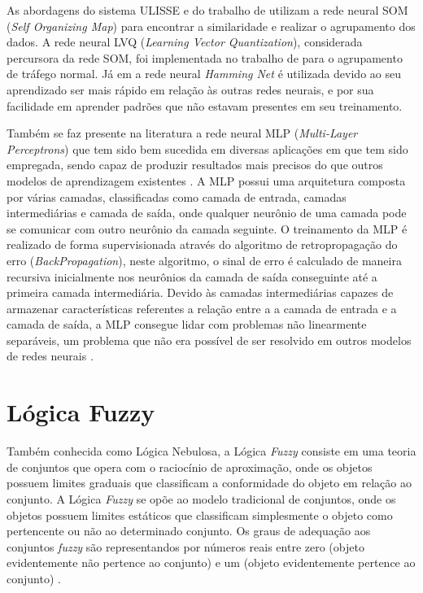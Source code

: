 \indent As abordagens do sistema ULISSE \cite{Zanero2008} e do trabalho de  utilizam a rede neural SOM (\textit{Self Organizing Map}) para encontrar a similaridade e realizar o agrupamento dos dados. A rede neural LVQ (\textit{Learning Vector Quantization}), considerada percursora da rede SOM, foi implementada no trabalho de  para o agrupamento de tráfego normal. Já em  a rede neural \textit{Hamming Net} é utilizada devido ao seu aprendizado ser mais rápido em relação às outras redes neurais, e por sua facilidade em aprender padrões que não estavam presentes em seu treinamento.

Também se faz presente na literatura a rede neural MLP (\textit{Multi-Layer Perceptrons}) que tem sido bem sucedida em diversas aplicações em que tem sido empregada, sendo capaz de produzir resultados mais precisos do que outros modelos de aprendizagem existentes \cite{agrawal2015}. A MLP possui uma arquitetura composta por várias camadas, classificadas como camada de entrada, camadas intermediárias e camada de saída, onde qualquer neurônio de uma camada pode se comunicar com outro neurônio da camada seguinte. O treinamento da MLP é realizado de forma supervisionada através do algoritmo  de retropropagação do erro (\textit{BackPropagation}), neste algoritmo, o sinal de erro é calculado de maneira recursiva inicialmente nos neurônios da camada de saída conseguinte  até a primeira camada intermediária. Devido às camadas intermediárias capazes de armazenar características referentes a relação entre a a camada de entrada e a camada de saída, a MLP consegue lidar com problemas não linearmente separáveis, um problema que não era possível de ser resolvido em outros modelos de redes neurais \cite{soares2011}.

  \section{Lógica Fuzzy}
\indent Também conhecida como Lógica Nebulosa, a Lógica \textit{Fuzzy} consiste em uma teoria de conjuntos que opera com o raciocínio de aproximação, onde os objetos possuem limites graduais que classificam a conformidade do objeto em relação ao conjunto. A Lógica \textit{Fuzzy} se opõe ao modelo tradicional de conjuntos, onde os objetos possuem limites estáticos que classificam simplesmente o objeto como pertencente ou não ao determinado conjunto. Os graus de adequação aos conjuntos \textit{fuzzy} são representandos por números reais entre zero (objeto evidentemente não pertence ao conjunto) e um (objeto evidentemente pertence ao conjunto) \cite{rehman2009}.

